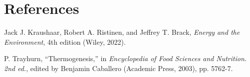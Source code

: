 \documentclass[prb,preprint]{revtex4-2}
\begin{document}
%

\section*{References}
\begin{thebibliography}{99}

Jack J. Kraushaar, Robert A. Ristinen, and Jeffrey T. Brack,
\textit{Energy and the Environment}, 
4th edition
(Wiley, 2022).

P. Trayhurn,
``Thermogenesis,''
in \textit{Encyclopedia of Food Sciences and Nutrition. 2nd ed.},
edited by Benjamin Caballero 
(Academic Press, 2003), pp. 5762-7.


\end{thebibliography}
\end{document}
